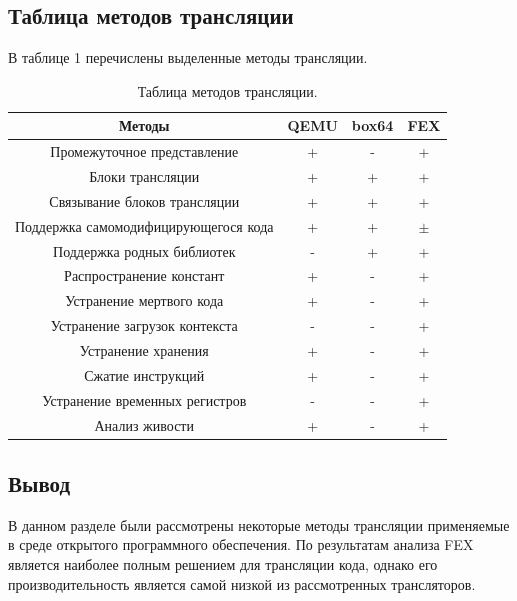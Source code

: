 \subsection{Таблица методов трансляции}

В таблице 1 %
перечислены выделенные методы трансляции. 

\begin{table}[!htb]
	\label{table:methods}
	\begin{center}
		\caption{Таблица методов трансляции.}
			\begin{tabular}{|c|c|c|c|}
				\hline
				\bfseries Методы & \bfseries QEMU & \bfseries box64 & \bfseries FEX  \\
				\hline
				Промежуточное представление & + & - & + \\ \hline
				Блоки трансляции & + & + & + \\ \hline
				Связывание блоков трансляции & + & + & + \\ \hline
				Поддержка самомодифицирующегося кода & + & + & $\pm$ \\ \hline
				Поддержка родных библиотек & - & + & + \\ \hline
				Распространение констант & + & - & + \\ \hline
				Устранение мертвого кода & + & - & + \\ \hline
				Устранение загрузок контекста & - & - & + \\ \hline
				Устранение хранения & + & - & + \\ \hline
				Сжатие инструкций & + & - & + \\ \hline
				Устранение временных регистров & - & - & + \\ \hline
				Анализ живости & + & - & + \\ \hline
		\end{tabular}
	\end{center}
\end{table}

\clearpage

\subsection{Вывод}

В данном разделе были рассмотрены некоторые методы трансляции применяемые в среде открытого программного обеспечения. По результатам анализа FEX является наиболее полным решением для трансляции кода, однако его производительность является самой низкой из рассмотренных трансляторов.

